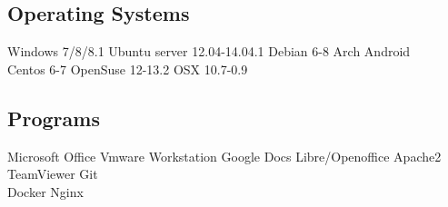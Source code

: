 \documentclass[letterpaper]{deedy-resume} %
\begin{document}
\begin{minipage}[t]{0.31\textwidth}
\sectionspace %

\subsection{Operating Systems}
Windows 7/8/8.1 \textbullet{} Ubuntu server 12.04-14.04.1 \textbullet{} Debian 6-8 \textbullet{} Arch  \textbullet{} Android \\
Centos 6-7   \textbullet{} OpenSuse 12-13.2 \textbullet{}   OSX 10.7-0.9 
\sectionspace %
\subsection{Programs}
 Microsoft Office \textbullet{} Vmware Workstation \textbullet{} Google Docs  \textbullet{} Libre/Openoffice \textbullet{}   Apache2 \textbullet{} TeamViewer \textbullet{} Git \\
Docker   \textbullet{} Nginx 
\sectionspace %

\end{minipage} %
\hfill
\begin{minipage}[t]{0.2\textwidth}
\end{minipage}
%
%
\end{document}
